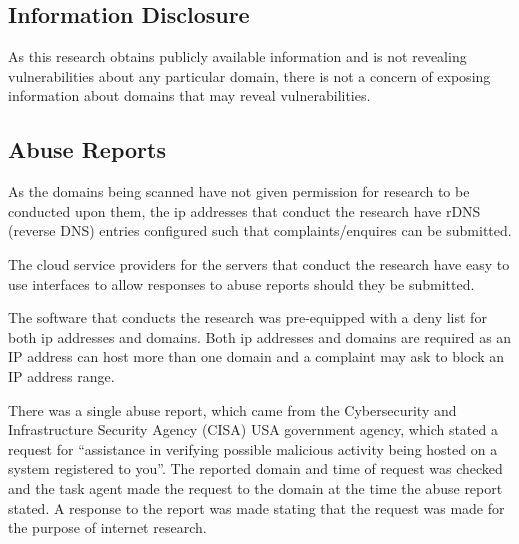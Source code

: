 \documentclass{mscreport}
\begin{document}
\subsection{Information Disclosure}

As this research obtains publicly available information and is not revealing vulnerabilities about any particular domain, there is not a concern of exposing information about domains that may reveal vulnerabilities.

\subsection{Abuse Reports}

As the domains being scanned have not given permission for research to be conducted upon them, the ip addresses that conduct the research have rDNS (reverse DNS) entries configured such that complaints/enquires can be submitted.

\vspace{0.3cm} \noindent
The cloud service providers for the servers that conduct the research have easy to use interfaces to allow responses to abuse reports should they be submitted.

\vspace{0.3cm} \noindent
The software that conducts the research was pre-equipped with a deny list for both ip addresses and domains. Both ip addresses and domains are required as an IP address can host more than one domain and a complaint may ask to block an IP address range.

\vspace{0.3cm} \noindent
There was a single abuse report, which came from the Cybersecurity and Infrastructure Security Agency (CISA) \cite{noauthor_undated-fh} USA government agency, which stated a request for ``assistance in verifying possible malicious activity being hosted on a system registered to you''. The reported domain and time of request was checked and the task agent made the request to the domain at the time the abuse report stated. A response to the report was made stating that the request was made for the purpose of internet research.

\newpage

%
\end{document}
